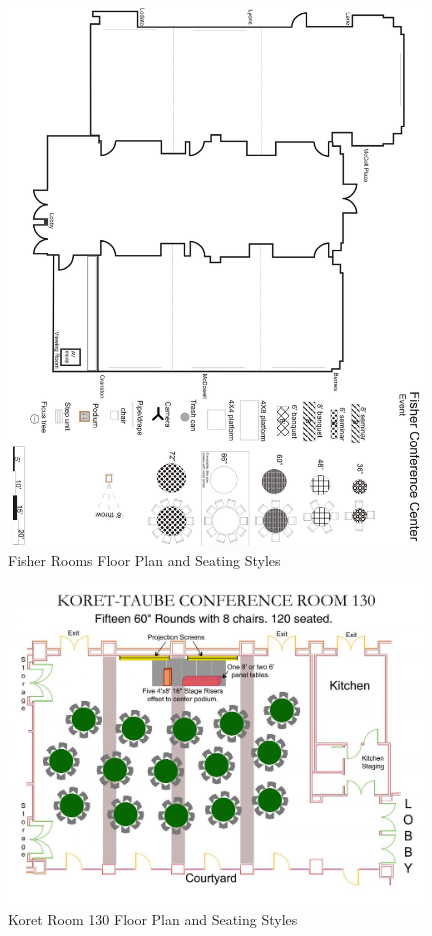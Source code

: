 \documentclass[11pt]{article}
\begin{document}
\begin{figure}
  \centering
  \includegraphics[width=0.98\textwidth]{fig/fpfisher}
  \caption{Fisher Rooms Floor Plan and Seating Styles}
  \label{fig:fisher-fp}
\end{figure}

\begin{figure}
  \centering
  \includegraphics[width=0.98\textwidth]{fig/koret130}
  \caption{Koret Room 130 Floor Plan and Seating Styles}
  \label{fig:koret-fp}
\end{figure}
\end{document}
